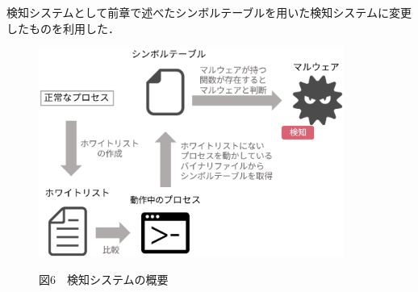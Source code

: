  検知システムとして前章で述べたシンボルテーブルを用いた検知システムに変更したものを利用した．


 \begin{figure}[h]
 \centering
    \includegraphics[width=100mm]{figures/system.eps}
 \label{fig:model}
 \begin{center}図6　検知システムの概要\end{center}
 \end{figure}
 

